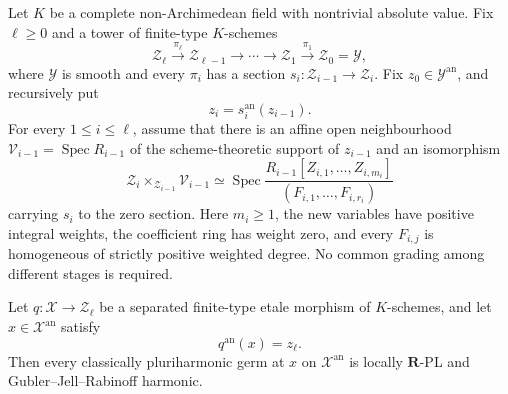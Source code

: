 \begin{theorem}
\label{thm:p061-algebraic-etale-weighted-cone-towers}
Let \(K\) be a complete non-Archimedean field with nontrivial absolute
value.  Fix \(\ell\geq0\) and a tower of finite-type \(K\)-schemes
\[
 \mathcal Z_\ell\xrightarrow{\pi_\ell}\mathcal Z_{\ell-1}
 \longrightarrow\cdots\longrightarrow
 \mathcal Z_1\xrightarrow{\pi_1}\mathcal Z_0=\mathcal Y,
\]
where \(\mathcal Y\) is smooth and every \(\pi_i\) has a section
\(s_i:\mathcal Z_{i-1}\to\mathcal Z_i\).  Fix
\(z_0\in\mathcal Y^{\mathrm{an}}\), and recursively put
\[
                         z_i=s_i^{\mathrm{an}}(z_{i-1}).
\]
For every \(1\leq i\leq\ell\), assume that there is an affine open
neighbourhood \(\mathcal V_{i-1}=\operatorname{Spec}R_{i-1}\) of the
scheme-theoretic support of \(z_{i-1}\) and an isomorphism
\[
 \mathcal Z_i\times_{\mathcal Z_{i-1}}\mathcal V_{i-1}
 \simeq
 \operatorname{Spec}
 \frac{R_{i-1}[Z_{i,1},\ldots,Z_{i,m_i}]}
      {(F_{i,1},\ldots,F_{i,r_i})}                                  \tag{\(*_i\)}
\]
carrying \(s_i\) to the zero section.  Here \(m_i\geq1\), the new
variables have positive integral weights, the coefficient ring has weight
zero, and every \(F_{i,j}\) is homogeneous of strictly positive weighted
degree.  No common grading among different stages is required.

Let \(q:\mathcal X\to\mathcal Z_\ell\) be a separated finite-type etale
morphism of \(K\)-schemes, and let \(x\in\mathcal X^{\mathrm{an}}\) satisfy
\[
                              q^{\mathrm{an}}(x)=z_\ell.
\]
Then every classically pluriharmonic germ at \(x\) on
\(\mathcal X^{\mathrm{an}}\) is locally \(\mathbf R\)-PL and
Gubler--Jell--Rabinoff harmonic.
\end{theorem}

